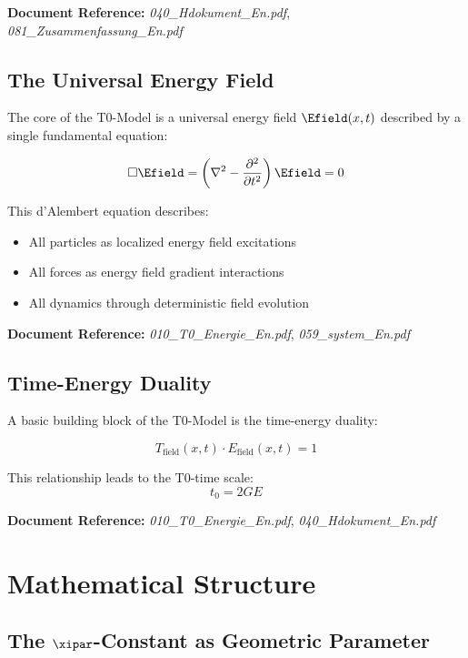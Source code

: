 \textbf{Document Reference:} \textit{040\_Hdokument\_En.pdf}, \textit{081\_Zusammenfassung\_En.pdf}

\subsection{The Universal Energy Field}

The core of the T0-Model is a universal energy field $\Efield(x,t)$ described by a single fundamental equation:

\begin{equation}
	\square \Efield = \left(\nabla^2 - \frac{\partial^2}{\partial t^2}\right) \Efield = 0
\end{equation}

This d'Alembert equation describes:
\begin{itemize}
	\item All particles as localized energy field excitations
	\item All forces as energy field gradient interactions
	\item All dynamics through deterministic field evolution
\end{itemize}

\textbf{Document Reference:} \textit{010\_T0\_Energie\_En.pdf}, \textit{059\_system\_En.pdf}

\subsection{Time-Energy Duality}

A basic building block of the T0-Model is the time-energy duality:

\begin{equation}
	T_{\text{field}}(x,t) \cdot E_{\text{field}}(x,t) = 1
\end{equation}

This relationship leads to the T0-time scale:
\begin{equation}
	t_0 = 2GE
\end{equation}

\textbf{Document Reference:} \textit{010\_T0\_Energie\_En.pdf}, \textit{040\_Hdokument\_En.pdf}

\section{Mathematical Structure}

\subsection{The $\xipar$-Constant as Geometric Parameter}

